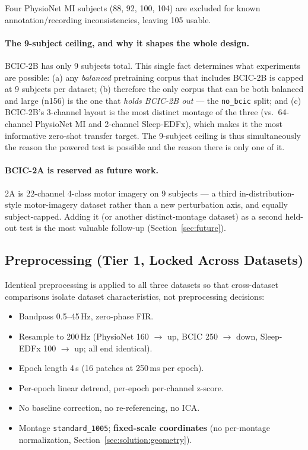 \documentclass[11pt]{article}
\begin{document}
Four PhysioNet MI subjects (88, 92, 100, 104) are excluded for known
annotation/recording inconsistencies, leaving 105 usable.

\paragraph{The 9-subject ceiling, and why it shapes the whole design.}
BCIC-2B has only 9 subjects total. This single fact determines what
experiments are possible: (a) any \emph{balanced} pretraining corpus that
includes BCIC-2B is capped at 9 subjects per dataset; (b) therefore the only
corpus that can be both balanced and large (n156) is the one that
\emph{holds BCIC-2B out} --- the \texttt{no\_bcic} split; and (c) BCIC-2B's
3-channel layout is the most distinct montage of the three (vs.\ 64-channel
PhysioNet MI and 2-channel Sleep-EDFx), which makes it the most informative
zero-shot transfer target. The 9-subject ceiling is thus simultaneously the
reason the powered test is possible and the reason there is only one of it.

\paragraph{BCIC-2A is reserved as future work.}
2A is 22-channel 4-class motor imagery on 9 subjects --- a third
in-distribution-style motor-imagery dataset rather than a new perturbation
axis, and equally subject-capped. Adding it (or another distinct-montage
dataset) as a second held-out test is the most valuable follow-up
(Section~\ref{sec:future}).

\subsection{Preprocessing (Tier 1, Locked Across Datasets)}
\label{sec:setup:preproc}

Identical preprocessing is applied to all three datasets so that
cross-dataset comparisons isolate dataset characteristics, not preprocessing
decisions:
\begin{itemize}[leftmargin=*, itemsep=2pt, topsep=2pt]
  \item Bandpass 0.5--45\,Hz, zero-phase FIR.
  \item Resample to 200\,Hz (PhysioNet 160 $\to$ up, BCIC 250 $\to$ down,
        Sleep-EDFx 100 $\to$ up; all end identical).
  \item Epoch length 4\,s (16 patches at 250\,ms per epoch).
  \item Per-epoch linear detrend, per-epoch per-channel z-score.
  \item No baseline correction, no re-referencing, no ICA.
  \item Montage \texttt{standard\_1005}; \textbf{fixed-scale coordinates}
        (no per-montage normalization, Section~\ref{sec:solution:geometry}).
\end{itemize}
\end{document}
